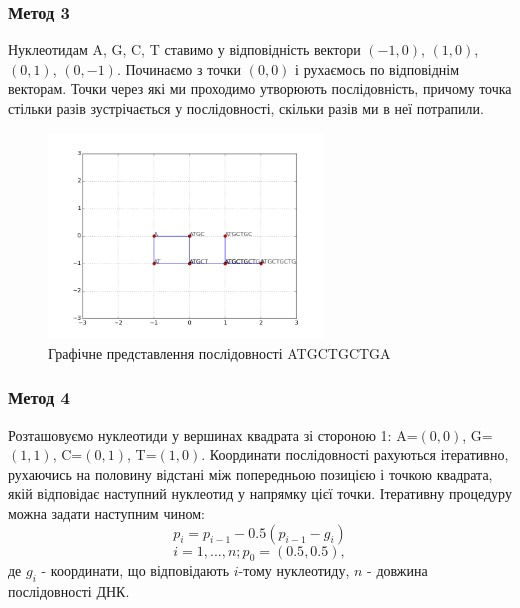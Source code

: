 \documentclass[mathserif,serif,10pt]{beamer}
\begin{document}
\begin{frame}
\frametitle{Метод 3}
Нуклеотидам A, G, C, T ставимо у відповідність вектори $(-1,0)$, $(1,0)$,
$(0,1)$, $(0,-1)$. Починаємо з точки $(0,0)$ і рухаємось по відповіднім
векторам. Точки через які ми проходимо утворюють послідовність, причому точка
стільки разів зустрічається у послідовності, скільки разів ми в неї потрапили.
\begin{figure}[h!]
\centering
\includegraphics[width=0.65\textwidth]{meth3}
\caption{Графічне представлення послідовності ATGCTGCTGA}
\end{figure}
\end{frame}

\begin{frame}
\frametitle{Метод 4}
Розташовуємо нуклеотиди у вершинах квадрата зі стороною 1: A=$(0,0)$,
G=$(1,1)$, C=$(0,1)$, T=$(1,0)$. Координати послідовності рахуються ітеративно,
рухаючись на половину відстані між попередньою позицією і точкою квадрата, якій
відповідає наступний нуклеотид у напрямку цієї точки. Ітеративну процедуру
можна задати наступним чином:
\[p_i = p_{i-1}-0.5(p_{i-1}-g_i)\]
\[i=1,...,n; p_0=(0.5,0.5),\]
де $g_i$ - координати, що відповідають $i$-тому нуклеотиду, $n$ - довжина послідовності ДНК.
\end{frame}
\end{document}
